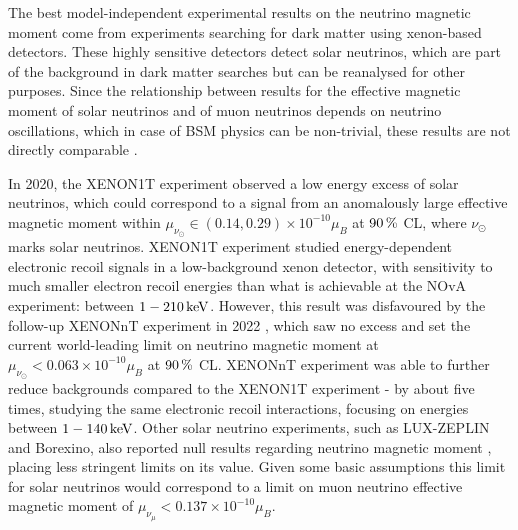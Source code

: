 The best model-independent experimental results on the neutrino magnetic moment come from experiments searching for dark matter using xenon-based detectors. These highly sensitive detectors detect solar neutrinos, which are part of the background in dark matter searches but can be reanalysed for other purposes. Since the relationship between  results for the effective magnetic moment of solar neutrinos and of muon neutrinos depends on neutrino oscillations, which in case of \gls{BSM} physics can be non-trivial, these results are not directly comparable \cite{LargeNuMMJointFit2022.pdf}.

In 2020, the XENON1T experiment observed \cite{XENON1TExcessNuOnE2020.pdf} a low energy excess of solar neutrinos, which could correspond to a signal from an anomalously large effective magnetic moment within $\mu_{\nu_\odot}\in \left(0.14, 0.29\right)\times 10^{-10} \mu_B$ at $\unit[90]{\%}$ \gls{CL}, where $\nu_\odot$ marks solar neutrinos. XENON1T experiment studied energy-dependent electronic recoil signals in a low-background xenon detector, with sensitivity to much smaller electron recoil energies than what is achievable at the \gls{NOvA} experiment: between $\unit[1-210]{keV}$. However, this result was disfavoured by the follow-up XENONnT experiment in 2022 \cite{XENONnTFirstResults2022.pdf}, which saw no excess and set the current world-leading limit on neutrino magnetic moment at $\mu_{\nu_\odot}<0.063\times 10^{-10}\mu_B$ at $\unit[90]{\%}$ \gls{CL}. XENONnT experiment was able to further reduce backgrounds compared to the XENON1T experiment - by about five times, studying the same electronic recoil interactions, focusing on energies between $\unit[1-140]{keV}$. Other solar neutrino experiments, such as LUX-ZEPLIN and Borexino, also reported null results regarding neutrino magnetic moment \cite{LZNuMMResults2022.pdf,BorexinoLimit2017.pdf}, placing less stringent limits on its value. Given some basic assumptions \cite{BorexinoLimit2017.pdf, NuElmagInXENONnTKhan2023.pdf} this limit for solar neutrinos would correspond to a limit on muon neutrino effective magnetic moment of $\mu_{\nu_\mu}<0.137\times 10^{-10}\mu_B$.



